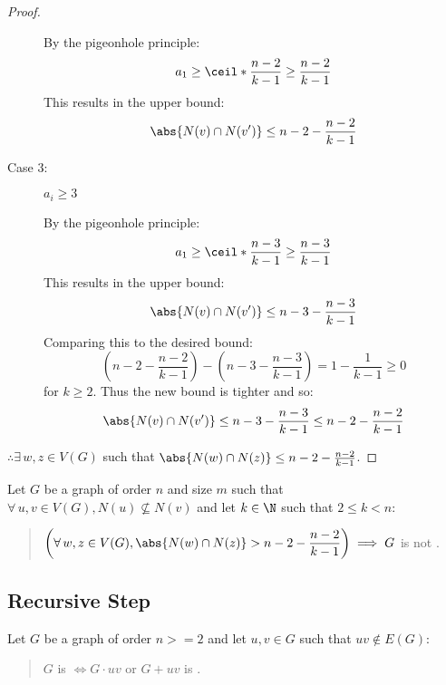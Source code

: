 \begin{proof}
\begin{description}
    By the pigeonhole principle:
    \[a_1\ge\ceil*{\frac{n-2}{k-1}}\ge\frac{n-2}{k-1}\]
    This results in the upper bound:
    \[\abs{N(v)\cap N(v')}\le n-2-\frac{n-2}{k-1}\]
    
  \item [Case 3:] \(a_i\ge3\)

    By the pigeonhole principle:
    \[a_1\ge\ceil*{\frac{n-3}{k-1}}\ge\frac{n-3}{k-1}\]
    This results in the upper bound:
    \[\abs{N(v)\cap N(v')}\le n-3-\frac{n-3}{k-1}\]
    Comparing this to the desired bound:
    \[\left(n-2-\frac{n-2}{k-1}\right)-\left(n-3-\frac{n-3}{k-1}\right)=1-\frac{1}{k-1}\ge0\]
    for \(k\ge2\).  Thus the new bound is tighter and so:
    \[\abs{N(v)\cap N(v')}\le n-3-\frac{n-3}{k-1}\le n-2-\frac{n-2}{k-1}\]
  \end{description}

  \(\displaystyle \therefore\exists\,w,z\in V(G)\) such that \(\abs{N(w)\cap N(z)}\le n-2-\frac{n-2}{k-1}\).
\end{proof}

\begin{corollary}
  \label{cor:inter}
  Let \(G\) be a graph of order \(n\) and size \(m\) such that \(\forall\,u,v\in V(G),N(u)\not\subseteq N(v)\) and let
  \(k\in\N\) such that \(2\le k<n\):
  \begin{quote}
    \(\displaystyle\left(\forall\,w,z\in V(G),\abs{N(w)\cap N(z)}>n-2-\frac{n-2}{k-1}\right)\implies G\) is not .
  \end{quote}
\end{corollary}

\subsection{Recursive Step}

\begin{lemma}
  \label{lem:recurse}
  Let \(G\) be a graph of order \(n>=2\) and let \(u,v\in G\) such that \(uv\notin E(G)\):
  \begin{quote}
    \(G\) is  \(\iff G\cdot uv\) or \(G+uv\) is .
  \end{quote}
\end{lemma}

